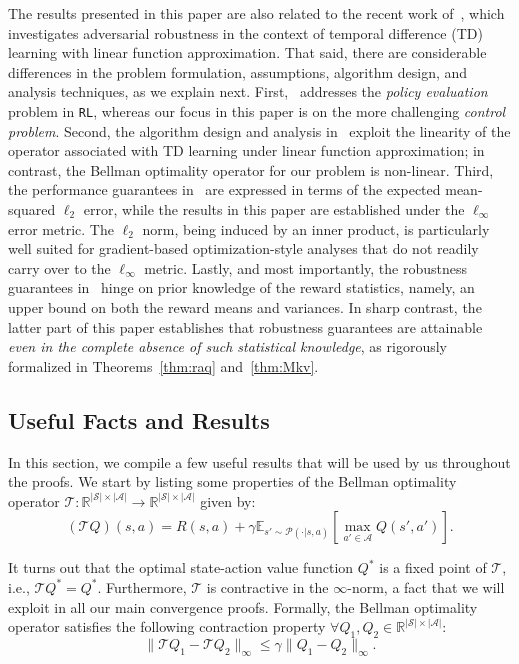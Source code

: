 \documentclass{article}
\newcommand{\mc}{\mathcal}
\begin{document}
\begin{enumerate}
The results presented in this paper are also related to the recent work of~\citet{maity2025robust}, which investigates  adversarial robustness in the context of temporal difference (TD) learning with linear function approximation. That said, there are considerable differences in the problem formulation, assumptions, algorithm design, and analysis techniques, as we explain next. First,~\citet{maity2025robust} addresses the \emph{policy evaluation} problem in \texttt{RL}, whereas our focus in this paper is on the more challenging \emph{control problem}. Second, the algorithm design and analysis in~\citet{maity2025robust} exploit the linearity of the operator associated with TD learning under linear function approximation; in contrast, the Bellman optimality operator for our problem is non-linear. Third, the performance guarantees in~\citet{maity2025robust} are expressed in terms of the expected mean-squared $\ell_{2}$ error, while the results in this paper are established under the $\ell_{\infty}$ error metric. The $\ell_{2}$ norm, being induced by an inner product, is particularly well suited for gradient-based optimization-style analyses that do not readily carry over to the $\ell_{\infty}$ metric. 
Lastly, and most importantly, the robustness guarantees in~\citet{maity2025robust} hinge on prior knowledge of the reward statistics, namely, an upper bound on both the reward means and variances. In sharp contrast, the latter part of this paper establishes that robustness guarantees are attainable \emph{even in the complete absence of such statistical knowledge}, as rigorously formalized in Theorems~\ref{thm:raq} and~\ref{thm:Mkv}.
\end{enumerate}

\subsection{Useful Facts and Results}
In this section, we compile a few useful results that will be used by us throughout the proofs. We start by listing some properties of the Bellman optimality operator $\mc{T}: \mathbb{R}^{|\mc{S}|  \times |\mc{A}|}  \rightarrow \mathbb{R}^{|\mc{S}|  \times |\mc{A}|}$ given by:
\begin{equation}\label{eqn:Bellman}
    (\mathcal{T}Q)(s,a) = R(s,a) + \gamma \mathbb{E}_{s' \sim \mc{P}(\cdot | s,a)}\left[\max_{a' \in \mathcal{A}} Q(s',a')\right].
\end{equation}

It turns out that the optimal state-action value function $Q^*$ is a fixed point of $\mc{T}$, i.e., $\mc{T}Q^* =Q^*.$ Furthermore, $\mc{T}$ is contractive in the $\infty$-norm, a fact that we will exploit in all our main convergence proofs. Formally, the Bellman optimality operator satisfies the following contraction property $\forall Q_1, Q_2 \in \mathbb{R}^{|\mc{S}| \times |\mc{A}|}$:
\begin{equation}\label{eqn:Bellmancontraction}
\lVert \mathcal{T} Q_1 - \mathcal{T} Q_2\rVert_{\infty}\le \gamma \lVert Q_1 - Q_2\rVert_{\infty}.
\end{equation}
\end{document}
